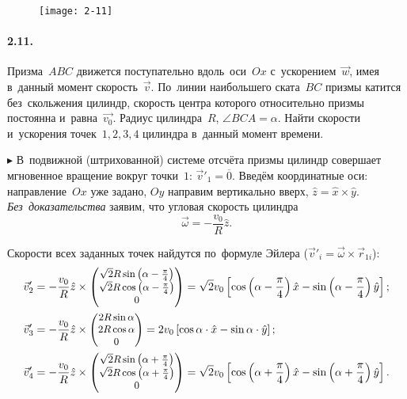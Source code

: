 \documentclass{weekly}
\begin{document}

\begin{wrapfigure}[6]{r}{4.5cm}\vspace{-5.5mm}
    \texttt{[image: 2-11]}
\end{wrapfigure}
\paragraph{2.11.} Призма~$ABC$ движется поступательно вдоль~оси~$Ox$
с~ускорением~$\vec{w}$, имея в~данный момент скорость~$\vec{v}$.
По~линии наибольшего ската~$BC$ призмы катится без~скольжения
цилиндр, скорость центра которого относительно призмы постоянна
и~равна~$\vec{v_0}$. Радиус цилиндра~$R$, $\angle BCA = \alpha$.
Найти скорости и~ускорения точек~$1, 2, 3, 4$ цилиндра
в~данный момент времени.

$\blacktriangleright$ В~подвижной (штрихованной) системе отсчёта призмы
цилиндр совершает мгновенное вращение вокруг точки~$1$:
$\vec v'_1 = \overline{0}$.
Введём координатные оси: направление~$Ox$ уже задано, $Oy$ направим
вертикально вверх, $\hat z = \hat x \times \hat y$.
\emph{Без~доказательства} заявим, что угловая скорость цилиндра
\begin{equation}
    \vec\omega = -\frac{v_0}{R} \hat z.
\end{equation}

Скорости всех заданных точек найдутся по~формуле Эйлера
($\vec v'_i = \vec\omega \times \vec r_{1i}$):
\begin{align}
    \vec v'_2 &= -\frac{v_0}{R} \hat z \times
            \small\begin{pmatrix}\sqrt{2} R\sin\left(\alpha - \frac{\pi}{4}\right)\\\sqrt{2} R\cos\left(\alpha - \frac{\pi}{4}\right)\\0\end{pmatrix}
        = \sqrt{2} v_0
            \left[ \cos\left(\alpha - \frac{\pi}{4}\right) \hat x
            - \sin\left(\alpha - \frac{\pi}{4}\right) \hat y \right]; \\
    \vec v'_3 &= -\frac{v_0}{R} \hat z \times
            \small\begin{pmatrix}2R\sin\alpha\\2R\cos\alpha\\0\end{pmatrix}
        = 2v_0 \left[ \cos\alpha \cdot \hat x -
            \sin\alpha \cdot \hat y \right]; \\
    \vec v'_4 &= -\frac{v_0}{R} \hat z \times
            \small\begin{pmatrix}\sqrt{2} R\sin\left(\alpha + \frac{\pi}{4}\right)\\\sqrt{2} R\cos\left(\alpha + \frac{\pi}{4}\right)\\0\end{pmatrix}
        = \sqrt{2} v_0
            \left[ \cos\left(\alpha + \frac{\pi}{4}\right) \hat x
            - \sin\left(\alpha + \frac{\pi}{4}\right) \hat y \right].
\end{align}
\end{document}
